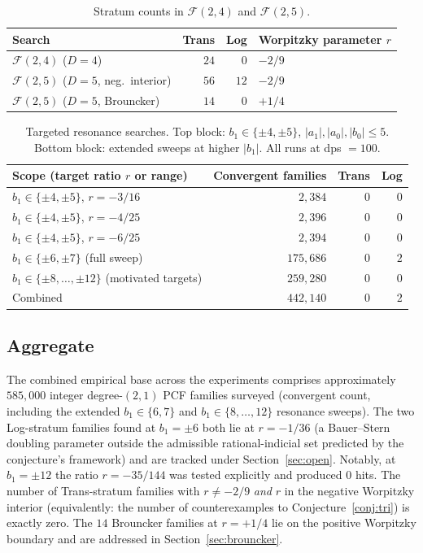 \documentclass[11pt]{amsart}
\theoremstyle{definition}
\theoremstyle{remark}
\newcommand{\FF}{\mathcal{F}}
\begin{document}
\begin{table}[t]
\centering
\caption{Stratum counts in $\FF(2,4)$ and $\FF(2,5)$.}
\label{tab:censuses}
\begin{tabular}{lrrl}
\toprule
Search            & Trans & Log & Worpitzky parameter $r$ \\
\midrule
$\FF(2,4)$ ($D=4$)         & $24$ & $0$  & $-2/9$         \\
$\FF(2,5)$ ($D=5$, neg.\ interior) & $56$ & $12$ & $-2/9$         \\
$\FF(2,5)$ ($D=5$, Brouncker)      & $14$ & $0$  & $+1/4$         \\
\bottomrule
\end{tabular}
\end{table}

\begin{table}[t]
\centering
\caption{Targeted resonance searches.  Top block: $b_1 \in \{\pm 4,
\pm 5\}$, $|a_1|,|a_0|,|b_0| \le 5$.  Bottom block: extended
sweeps at higher $|b_1|$.  All runs at dps $=100$.}
\label{tab:resonance}
\begin{tabular}{lrrr}
\toprule
Scope (target ratio $r$ or range) & Convergent families & Trans & Log \\
\midrule
$b_1 \in \{\pm 4, \pm 5\}$, $r = -3/16$ & $2{,}384$ & $0$ & $0$ \\
$b_1 \in \{\pm 4, \pm 5\}$, $r = -4/25$ & $2{,}396$ & $0$ & $0$ \\
$b_1 \in \{\pm 4, \pm 5\}$, $r = -6/25$ & $2{,}394$ & $0$ & $0$ \\
\midrule
$b_1 \in \{\pm 6, \pm 7\}$ (full sweep) & $175{,}686$ & $0$ & $2$ \\
$b_1 \in \{\pm 8,\dots,\pm 12\}$ (motivated targets) & $259{,}280$ & $0$ & $0$ \\
\midrule
Combined        & $442{,}140$ & $0$ & $2$ \\
\bottomrule
\end{tabular}
\end{table}

\subsection*{Aggregate}
The combined empirical base across the experiments comprises
approximately $585{,}000$ integer degree-$(2,1)$ PCF families
surveyed (convergent count, including the extended
$b_1 \in \{6,7\}$ and $b_1 \in \{8,\dots,12\}$ resonance sweeps).
The two Log-stratum families found at $b_1 = \pm 6$ both lie at
$r = -1/36$ (a Bauer--Stern doubling parameter outside the
admissible rational-indicial set predicted by the conjecture's
framework) and are tracked under Section~\ref{sec:open}.  Notably,
at $b_1 = \pm 12$ the ratio $r = -35/144$ was tested explicitly
and produced $0$ hits.  The number of Trans-stratum families with
$r \ne -2/9$ \emph{and} $r$ in the negative Worpitzky
interior
(equivalently: the number of counterexamples to
Conjecture~\ref{conj:tri}) is exactly zero.  The $14$ Brouncker
families at $r = +1/4$ lie on the positive Worpitzky boundary and
are addressed in Section~\ref{sec:brouncker}.
\end{document}
